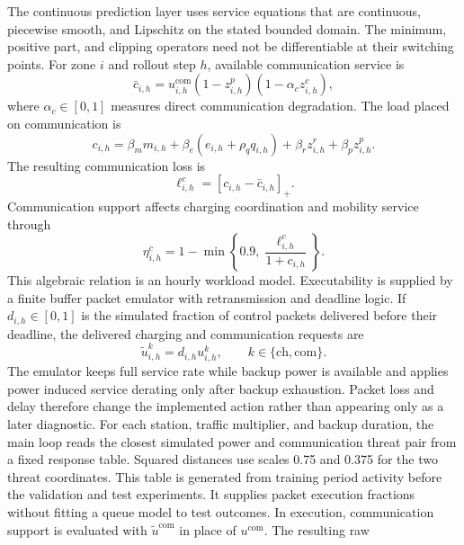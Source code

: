 \documentclass[journal]{IEEEtran}
\begin{document}
The continuous prediction layer uses service equations that are
continuous, piecewise smooth, and Lipschitz on the stated bounded domain.
The minimum, positive part, and clipping operators need not be differentiable
at their switching points.
For zone $i$ and rollout step $h$, available communication service is
\begin{equation}
\bar c_{i,h}=u_{i,h}^{\mathrm{com}}(1-z_{i,h}^{p})(1-\alpha_c z_{i,h}^{c}),
\end{equation}
where $\alpha_c\in[0,1]$ measures direct communication degradation.  The load
placed on communication is
\begin{equation}
c_{i,h}=\beta_m m_{i,h}+\beta_e(e_{i,h}+\rho_q q_{i,h})
+\beta_r z_{i,h}^{r}+\beta_p z_{i,h}^{p}.
\end{equation}
The resulting communication loss is
\begin{equation}
\ell_{i,h}^{c}=[c_{i,h}-\bar c_{i,h}]_+.
\end{equation}
Communication support affects charging coordination and mobility service through
\begin{equation}
\eta_{i,h}^{c}=1-\min\left\{0.9,\frac{\ell_{i,h}^{c}}{1+c_{i,h}}\right\}.
\end{equation}
This algebraic relation is an hourly workload model.  Executability is supplied
by a finite buffer packet emulator with retransmission and deadline logic.  If
$d_{i,h}\in[0,1]$ is the simulated fraction of control packets delivered before
their deadline, the delivered charging and communication requests are
\begin{equation}
\tilde u_{i,h}^{k}=d_{i,h}u_{i,h}^{k},\qquad
k\in\{\mathrm{ch},\mathrm{com}\}.
\label{eq:packet-derate}
\end{equation}
The emulator keeps full service rate while backup power is available and
applies power induced service derating only after backup exhaustion.  Packet
loss and delay therefore change the implemented action rather than appearing
only as a later diagnostic.  For each station, traffic multiplier, and backup
duration, the main loop reads the closest simulated power and communication
threat pair from a fixed response table.  Squared distances use scales 0.75 and
0.375 for the two threat coordinates.  This table is generated from training
period activity before the validation and test experiments.  It supplies packet
execution fractions without fitting a queue model to test outcomes.
In execution, communication support is evaluated with
$\tilde u^{\mathrm{com}}$ in place of $u^{\mathrm{com}}$.  The resulting raw
\end{document}
